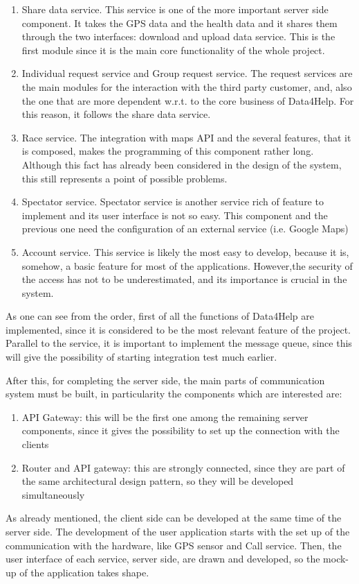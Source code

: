 \begin{enumerate}
\item Share data service.
This service is one of the more important server side component. It takes the GPS data and the health data
and it shares them through the two interfaces: download and upload data service. 
This is the first module since it is the main core functionality of the whole project. 
\item Individual request service and Group request service.
The request services are the main modules for the interaction with the third party customer, and, also
the one that are more dependent w.r.t. to the core business of Data4Help. For this reason, it follows 
the share data service.
\item Race service.
The integration with maps API and the several features, that it is composed, makes the programming of this
component rather long. Although this fact has already been considered in the design of the system, this
still represents a point of possible problems.
\item Spectator service.
Spectator service is another service rich of feature to implement and its user interface is not so easy.  
This component and the previous one need the configuration of an external service (i.e. Google Maps) 
\item Account service. 
This service is likely the most easy to develop, because it is, somehow, a basic feature for most of the
applications. 
However,the security of the access has not to be underestimated, and its importance is crucial in the
system.
\end{enumerate}   
As one can see from the order, first of all the functions of Data4Help are implemented, since it is
considered to be the most relevant feature of the project. \\ 
Parallel to the service, it is important to implement the message queue, since this will give the 
possibility of starting integration test much earlier. 

After this, for completing the server side, the main parts of communication system must be built, in
particularity the components which are interested are: 
\begin{enumerate}
\item API Gateway: this will be the first one among the remaining server components, since it gives the
possibility to set up the connection with the clients
\item Router and API gateway: this are strongly connected, since they are part of the same architectural
design pattern, so they will be developed simultaneously
\end{enumerate}

\par
As already mentioned, the client side can be developed at the same time of the server side. 
The development of the user application starts with the set up of the communication with the hardware,
like GPS sensor and Call service. 
Then, the user interface of each service, server side, are drawn and developed, so the mock-up of the
application takes shape.